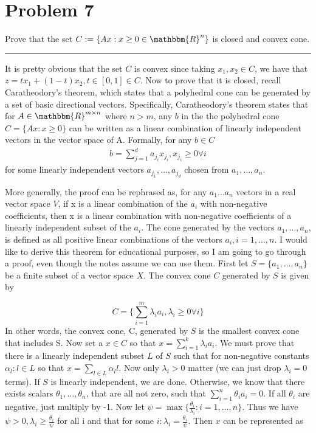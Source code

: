 \documentclass{article} %
\newcommand{\R}{\mathbbm{R}}
\begin{document}
\section*{Problem 7}
Prove that the set  $C := \{ Ax : x \geq 0 \in \R^n\}$ is closed and convex cone. 
\rule{\textwidth}{1pt}
It is pretty obvious that the set $C$ is convex since taking $x_1, x_2 \in C$, we have that $z = tx_1 + (1 - t)x_2, t \in [0,1] \in C$. Now to prove that it is closed,
recall Caratheodory’s theorem, which states that a polyhedral cone can be generated by a set of basic directional vectors. 
Specifically, Caratheodory's theorem states that for $A \in \R^{m \times n}$ where $n > m$, any $b$ in the the polyhedral cone $C = \{ Ax:  x\geq0 \}$ can be 
written as a linear combination of linearly independent vectors in the vector space of A.  Formally, for any $b \in C$
\begin{gather*}
b = \sum_{j=1}^{d} a_{j_i} x_{j_i}, x_{j_i} \geq 0 \forall i
\end{gather*}
for some linearly independent vectors $a_{j_1}, \hdots, a_{j_d}$ chosen from $a_1, \hdots, a_n$.


More generally, the proof can be rephrased as, for any $a_1 \hdots a_n$ vectors in a real vector space
$V$, if x is a linear combination of the $a_i$ with non-negative coefficients, then
x is a linear combination with non-negative coefficients of a linearly independent
subset of the $a_i$. The cone generated by the vectors $a_1, \hdots, a_n$, is defined as all positive linear combinations
of the vectors $a_i, i = 1, \hdots, n$. I would like to derive this theorem for educational purposes, so I am going to go through a proof, even though
the notes assume we can use them. First let $S = \{ a_1, \hdots, a_n \}$ be a finite subset of a vector space $X$. The convex cone $C$ generated by 
$S$ is given by

\[
C = \{ \sum_{i=1}^{m} \lambda_i a_i, \lambda_i \geq 0  \forall i \}
\] 
In other words,  the convex cone, C,  generated by $S$ is the smallest convex cone that includes S. 
Now set a $x \in C$ so that $x = \sum_{i=1}^{k}\lambda_i a_i $. We must prove that there is a linearly independent subset $L$ of $S$ such that 
for non-negative constants $\alpha_l: l  \in L$ so that $ x = \sum_{l \in L} \alpha_l l$. Now only $\lambda_i > 0$ matter (we  can just drop $\lambda_i = 0$ terms). If $S$ is linearly independent, we are done. Otherwise, we know that there exists scalars $\theta_1, \hdots , \theta_n$, that are all not zero, such that
$\sum_{i=1}^{n} \theta_i a_i = 0$. If all $\theta_i$ are negative, just multiply by -1. Now let $\psi = \max \{ \frac{\theta_i}{\lambda_i}: i=1,  \hdots, n\}$. Thus we have $\psi > 0, \lambda_i \geq \frac{\theta_i}{\psi}$ for all i and that for some $i: \lambda_i = \frac{\theta_i}{\psi}$. Then $x$ can be represented as 
\end{document}
